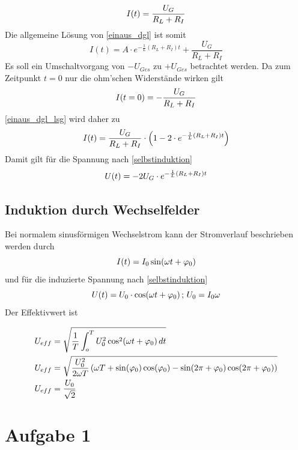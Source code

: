 \documentclass{article}
\begin{document}
\begin{equation}
I(t) = \frac{U_{G}}{R_L+R_I}
\notag
\end{equation}
\noindent
Die allgemeine Lösung von \eqref{einaus_dgl} ist somit
\begin{equation}
I(t) = A \cdot e^{-\frac{1}{L}(R_L+R_I)t} + \frac{U_{G}}{R_L+R_I}
\label{einaus_dgl_lsg}
\end{equation}
\noindent
Es soll ein Umschaltvorgang von \(-U_{Ges}\) zu \(+U_{Ges}\) betrachtet werden.
Da zum Zeitpunkt \(t=0\) nur die ohm'schen Widerstände wirken gilt
\begin{equation}
I(t=0) = -\frac{U_{G}}{R_L+R_I}
\notag
\end{equation}
\noindent
\eqref{einaus_dgl_lsg} wird daher zu
\begin{equation}
I(t) = \frac{U_{G}}{R_L+R_I} \cdot \left(1-2 \cdot e^{-\frac{1}{L}(R_L+R_I)t} \right)
\notag
\end{equation}
\noindent
Damit gilt für die Spannung nach  \eqref{selbstinduktion}
\begin{equation}
U(t) = -2 U_{G}\cdot e^{-\frac{1}{L}(R_L+R_I)t}
\notag
\end{equation}

\subsection{Induktion durch Wechselfelder}
Bei normalem sinusförmigen Wechselstrom kann der Stromverlauf beschrieben werden durch
\begin{equation}
I(t) = I_0 \sin(\omega t + \varphi_0)
\notag
\end{equation}
\noindent
und für die induzierte Spannung nach  \eqref{selbstinduktion}
\begin{equation}
U(t) = U_0 \cdot \cos(\omega t + \varphi_0)\, ; \, U_0 = I_0 \omega
\notag
\end{equation}
\noindent
Der Effektivwert ist

\begin{align}
U_{eff} &= \sqrt{\frac{1}{T} \int_o^T U_0^2 \cos^2(\omega t + \varphi_0) \, dt}
\notag
\\
U_{eff} &= \sqrt{\frac{U_0^2}{2 \omega T} 
\left( \omega T + \sin(\varphi_0) \cos(\varphi_0) - 
\sin(2\pi + \varphi_0) \cos(2\pi + \varphi_0) \right)}
\notag
\\
U_{eff} &= \frac{U_0}{\sqrt{2}}
\label{U_eff}
\end{align}

\section{Aufgabe 1}
\end{document}
